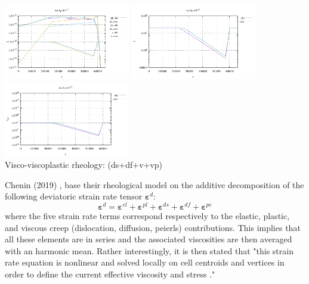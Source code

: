 \begin{itemize}
\begin{center}
\includegraphics[width=5.5cm]{images/rheology/example/profile_sr_pl-1}
\includegraphics[width=5.5cm]{images/rheology/example/profile_tau_pl-1}
\includegraphics[width=5.5cm]{images/rheology/example/profile_etaeff_pl-1}\\
{\captionfont Visco-viscoplastic rheology: (ds+df+v+vp)} 
\end{center}




\end{itemize}




\begin{remark}
Chenin \etal (2019) \cite{chmd19}, 
base their rheological model on the additive decomposition of the following
deviatoric strain rate tensor ${\bm \varepsilon}^d$:
\[
{\bm \varepsilon}^d =
{\bm \varepsilon}^{el}+
{\bm \varepsilon}^{pl}+
{\bm \varepsilon}^{ds}+
{\bm \varepsilon}^{df}+
{\bm \varepsilon}^{pe}
\]
where the five strain rate terms correspond respectively to the elastic, plastic, 
and viscous creep (dislocation, diffusion, peierls) contributions. 
This implies that all these elements are in series and the associated 
viscosities are then averaged with an harmonic mean. 
Rather interestingly, it is then stated that "this strain rate equation is nonlinear
and solved locally on cell centroids and vertices in order to define the current effective viscosity 
and stress \cite{poso08}."
\end{remark}

